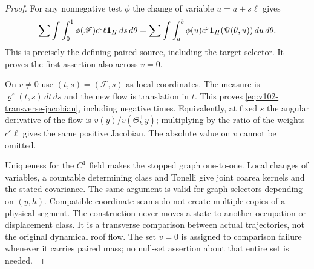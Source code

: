 \begin{proof}
For any nonnegative test $\phi$ the change of variable
$u=a+s\ell$ gives
\[
 \sum\int\int_0^1\phi(\mathscr F)
 c^\varepsilon\ell\mathbf1_H\,ds\,d\theta
 =\sum\int\int_a^b\phi(u)c^\varepsilon\mathbf1_H(\Psi(\theta,u))
                                                       \,du\,d\theta.
\]
This is precisely the defining paired source, including the target
selector. It proves the first assertion also across $v=0$.

On $v\ne0$ use $(t,s)=(\mathscr F,s)$ as local coordinates.
The measure is $\varrho^\varepsilon(t,s)\,dt\,ds$ and the new
flow is translation in $t$. This proves
\eqref{eq:v102-transverse-jacobian}, including negative times.
Equivalently, at fixed $s$ the angular derivative of the flow is
$v(y)/v(\Theta_h^\perp y)$; multiplying by the ratio of the
weights $c^\varepsilon\ell$ gives the same positive Jacobian.
The absolute value on $v$ cannot be omitted.

Uniqueness for the $C^1$ field makes the stopped graph one-to-one.
Local changes of variables, a countable determining class and
Tonelli give joint coarea kernels and the stated covariance. The
same argument is valid for graph selectors depending on $(y,h)$.
Compatible coordinate seams do not create multiple copies of a
physical segment. The construction never moves a state to another
occupation or displacement class. It is a transverse comparison
between actual trajectories, not the original dynamical roof flow.
The set $v=0$ is assigned to comparison failure whenever it carries
paired mass; no null-set assertion about that entire set is needed.
\end{proof}
